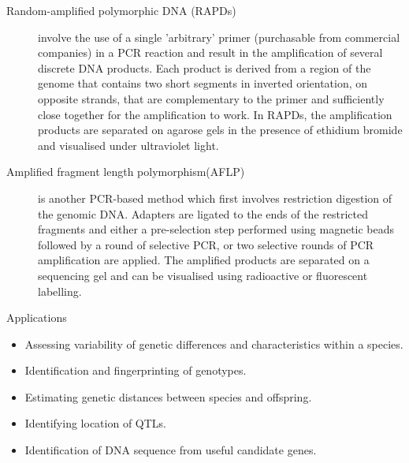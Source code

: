 \documentclass[11pt,dvipsnames,ignorenonframetext,aspectratio=169]{beamer}
\providecommand{\tightlist}{%
  \setlength{\itemsep}{0pt}\setlength{\parskip}{0pt}}
\begin{document}
\begin{frame}{}
\protect\hypertarget{section-5}{}
\begin{description}
\item[Random-amplified polymorphic DNA (RAPDs)] involve the use of a single 'arbitrary' primer (purchasable from commercial companies) in a PCR reaction and result in the amplification of several discrete DNA products. Each product is derived from a region of the genome that contains two short segments in inverted orientation, on opposite strands, that are complementary to the primer and sufficiently close together for the amplification to work. In RAPDs, the amplification products are separated on agarose gels in the presence of ethidium bromide and visualised under ultraviolet light.
\item[Amplified fragment length polymorphism(AFLP)]  is another PCR-based method which first involves restriction digestion of the genomic DNA. Adapters are ligated to the ends of the restricted fragments and either a pre-selection step performed using magnetic beads followed by a round of selective PCR, or two selective rounds of PCR amplification are applied. The amplified products are separated on a sequencing gel and can be visualised using radioactive or fluorescent labelling.
\end{description}
\end{frame}

\begin{frame}{Applications}
\protect\hypertarget{applications}{}
\begin{itemize}
\tightlist
\item
  Assessing variability of genetic differences and characteristics
  within a species.
\item
  Identification and fingerprinting of genotypes.
\item
  Estimating genetic distances between species and offspring.
\item
  Identifying location of QTLs.
\item
  Identification of DNA sequence from useful candidate genes.
\end{itemize}
\end{frame}
\end{document}
